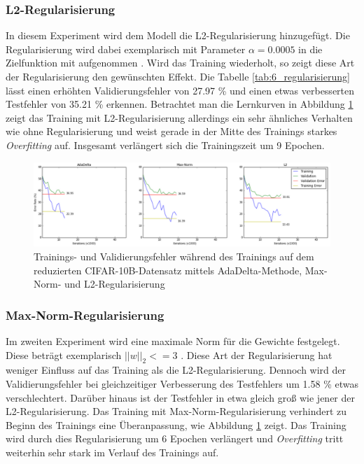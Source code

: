 \subsubsection{L2-Regularisierung}
In diesem Experiment wird dem Modell die L2-Regularisierung hinzugefügt. Die Regularisierung wird dabei exemplarisch mit Parameter $\alpha = 0.0005$ in die Zielfunktion mit aufgenommen \cite[vgl.][]{Krizhevsky2012}.
Wird das Training wiederholt, so zeigt diese Art der Regularisierung den gewünschten Effekt. Die Tabelle \ref{tab:6_regularisierung} lässt einen erhöhten Validierungsfehler von 27.97 \% und einen etwas verbesserten Testfehler von 35.21 \% erkennen. Betrachtet man die Lernkurven in Abbildung \ref{fig:6_overfit_max_l2} zeigt das Training mit L2-Regularisierung allerdings ein sehr ähnliches Verhalten wie ohne Regularisierung und weist gerade in der Mitte des Trainings starkes \textit{Overfitting} auf. Insgesamt verlängert sich die Trainingszeit um 9 Epochen.

\begin{figure}
\centering
\includegraphics[width=0.8\linewidth]{images/6_overfit_max_l2_2}
\caption[]{Trainings- und Validierungsfehler während des Trainings auf dem reduzierten CIFAR-10B-Datensatz mittels AdaDelta-Methode, Max-Norm- und L2-Regularisierung}
\label{fig:6_overfit_max_l2}
\end{figure}


\subsubsection{Max-Norm-Regularisierung}
Im zweiten Experiment wird eine maximale Norm für die Gewichte festgelegt. Diese beträgt exemplarisch $ ||w||_2 <= 3  $ \cite[vgl.][]{Srivastava2014}.
Diese Art der Regularisierung hat weniger Einfluss auf das Training als die L2-Regularisierung. Dennoch wird der Validierungsfehler bei gleichzeitiger Verbesserung des Testfehlers um 1.58 \% etwas verschlechtert. Darüber hinaus ist der Testfehler in etwa gleich groß wie jener der L2-Regularisierung. Das Training mit Max-Norm-Regularisierung verhindert zu Beginn des Trainings eine Überanpassung, wie Abbildung \ref{fig:6_overfit_max_l2} zeigt. Das Training wird durch dies Regularisierung um 6 Epochen verlängert und \textit{Overfitting} tritt weiterhin sehr stark im Verlauf des Trainings auf.

